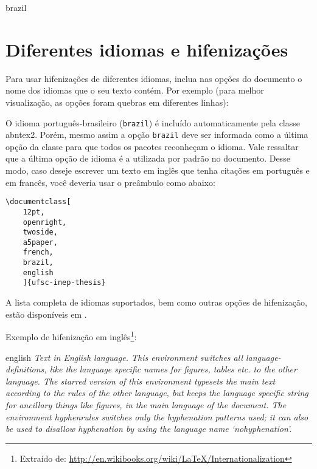 \begin{otherlanguage*}{brazil}
\section{Diferentes idiomas e hifenizações}
\label{sec-hifenizacao}

Para usar hifenizações de diferentes idiomas, inclua nas opções do documento o
nome dos idiomas que o seu texto contém. Por exemplo (para melhor
visualização, as opções foram quebras em diferentes linhas):


O idioma português-brasileiro (\texttt{brazil}) é incluído automaticamente pela
classe \textsf{abntex2}. Porém, mesmo assim a opção \texttt{brazil} deve ser
informada como a última opção da classe para que todos os pacotes reconheçam o
idioma. Vale ressaltar que a última opção de idioma é a utilizada por padrão no
documento. Desse modo, caso deseje escrever um texto em inglês que tenha
citações em português e em francês, você deveria usar o preâmbulo como abaixo:

\begin{verbatim}
\documentclass[
    12pt,
    openright,
    twoside,
    a5paper,
    french,
    brazil,
    english
    ]{ufsc-inep-thesis}
\end{verbatim}

A lista completa de idiomas suportados, bem como outras opções de hifenização,
estão disponíveis em .

Exemplo de hifenização em inglês\footnote{Extraído de:
\url{http://en.wikibooks.org/wiki/LaTeX/Internationalization}}:

\begin{otherlanguage*}{english}
\textit{Text in English language. This environment switches all language\hyp{}definitions,
like the language specific names for figures, tables etc. to the other
language. The starred version of this environment typesets the main text
according to the rules of the other language, but keeps the language specific
string for ancillary things like figures, in the main language of the document.
The environment hyphenrules switches only the hyphenation patterns used; it can
also be used to disallow hyphenation by using the language name
`nohyphenation'.}
\end{otherlanguage*}


\end{otherlanguage*}
